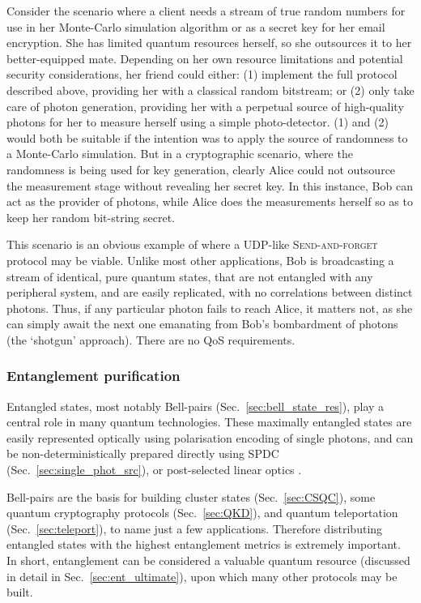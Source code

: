 Consider the scenario where a client needs a stream of true random numbers for use in her Monte-Carlo simulation algorithm or as a secret key for her email encryption. She has limited quantum resources herself, so she outsources it to her better-equipped mate. Depending on her own resource limitations and potential security considerations, her friend could either: (1) implement the full protocol described above, providing her with a classical random bitstream; or (2) only take care of photon generation, providing her with a perpetual source of high-quality photons for her to measure herself using a simple photo-detector. (1) and (2) would both be suitable if the intention was to apply the source of randomness to a Monte-Carlo simulation. But in a cryptographic scenario, where the randomness is being used for key generation, clearly Alice could not outsource the measurement stage without revealing her secret key. In this instance, Bob can act as the provider of photons, while Alice does the measurements herself so as to keep her random bit-string secret.

This scenario is an obvious example of where a UDP-like \textsc{Send-and-forget} protocol may be viable. Unlike most other applications, Bob is broadcasting a stream of identical, pure quantum states, that are not entangled with any peripheral system, and are easily replicated, with no correlations between distinct photons. Thus, if any particular photon fails to reach Alice, it matters not, as she can simply await the next one emanating from Bob's bombardment of photons (the `shotgun' approach). There are no QoS requirements.

%
%

\subsubsection{Entanglement purification} \label{sec:ent_purif} 

Entangled states, most notably Bell-pairs (Sec.~\ref{sec:bell_state_res}), play a central role in many quantum technologies. These maximally entangled states are easily represented optically using polarisation encoding of single photons, and can be non-deterministically prepared directly using SPDC (Sec.~\ref{sec:single_phot_src}), or post-selected linear optics \cite{???}.

Bell-pairs are the basis for building cluster states (Sec.~\ref{sec:CSQC}), some quantum cryptography protocols (Sec.~\ref{sec:QKD}), and quantum teleportation (Sec.~\ref{sec:teleport}), to name just a few applications. Therefore distributing entangled states with the highest entanglement metrics is extremely important. In short, entanglement can be considered a valuable quantum resource (discussed in detail in Sec.~\ref{sec:ent_ultimate}), upon which many other protocols may be built.

